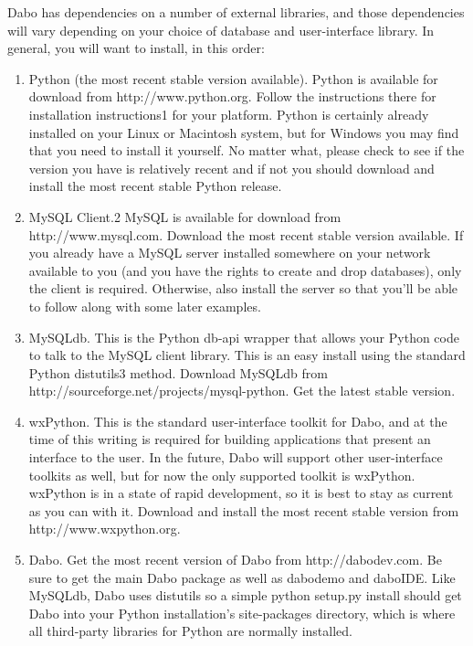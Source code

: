 Dabo has dependencies on a number of external libraries, and those dependencies will vary depending on your choice of database and user-interface library. In general, you will want to install, in this order:
\begin{enumerate}
	\item Python (the most recent stable version available). Python is available for download from http://www.python.org. Follow the instructions there for installation instructions1 for your platform. Python is certainly already installed on your Linux or Macintosh system, but for Windows you may find that you need to install it yourself. No matter what, please check to see if the version you have is relatively recent and if not you should download and install the most recent stable Python release.

	\item MySQL Client.2 MySQL is available for download from http://www.mysql.com. Download the most recent stable version available. If you already have a MySQL server installed somewhere on your network available to you (and you have the rights to create and drop databases), only the client is required. Otherwise, also install the server so that you'll be able to follow along with some later examples.

	\item MySQLdb. This is the Python db-api wrapper that allows your Python code to talk to the MySQL client library. This is an easy install using the standard Python distutils3 method. Download MySQLdb from http://sourceforge.net/projects/mysql-python. Get the latest stable version.

	\item wxPython. This is the standard user-interface toolkit for Dabo, and at the time of this writing is required for building applications that present an interface to the user. In the future, Dabo will support other user-interface toolkits as well, but for now the only supported toolkit is wxPython. wxPython is in a state of rapid development, so it is best to stay as current as you can with it. Download and install the most recent stable version from http://www.wxpython.org.

	\item Dabo. Get the most recent version of Dabo from http://dabodev.com. Be sure to get the main Dabo package as well as dabodemo and daboIDE. Like MySQLdb, Dabo uses distutils so a simple python setup.py install should get Dabo into your Python installation's site-packages directory, which is where all third-party libraries for Python are normally installed.
\end{enumerate}

